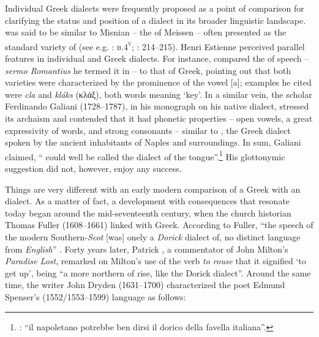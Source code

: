 Individual Greek dialects were frequently proposed as a point of comparison for clarifying the status and position of a  dialect in its broader linguistic landscape.  was said to be similar to Misnian – the  of Meissen – often presented as the standard variety of  (see e.g. \citealt{Borner1705}: \textsc{b.4}\textsc{\textsuperscript{v}}; \citealt{Simonis1752}: 214–215). Henri Estienne perceived parallel features in individual  and Greek dialects. For instance, \citet[3--4]{Estienne1582} compared the  of  speech – \textit{sermo Romantius} he termed it in  – to that of  Greek, pointing out that both varieties were characterized by the prominence of the vowel [a]; examples he cited were  \textit{cla} and  \textit{kláks} (κλάξ), both words meaning ‘key’. In a similar vein, the  scholar Ferdinando Galiani (1728–1787), in his monograph on his native  dialect, stressed its archaism and contended that it had phonetic properties – open vowels, a great expressivity of words, and strong consonants – similar to , the Greek dialect spoken by the ancient inhabitants of Naples and surroundings. In sum, Galiani claimed, “ could well be called the  dialect of the  tongue”.\footnote{\citet[16]{Galiani1779}: “il napoletano potrebbe ben dirsi il dorico della favella italiana”.} His glottonymic suggestion did not, however, enjoy any success.

Things are very different with an early modern comparison of a Greek with an  dialect. As a matter of fact, a development with consequences that resonate today began around the mid-seventeenth century, when the church historian Thomas Fuller (1608–1661) linked  with  Greek. According to Fuller, “the speech of the modern Southern-\textit{Scot} [was] onely a \textit{Dorick} dialect of, no distinct language from \textit{English}” \citep[81]{Fuller1655}. Forty years later, Patrick \citet[20]{Hume1695}, a commentator of John Milton’s \textit{Paradise Lost}, remarked on Milton’s use of the verb \textit{to rouse} that it signified ‘to get up’, being “a more northern  of rise, like the Dorick dialect”. Around the same time, the writer John Dryden (1631–1700) characterized the  poet Edmund Spenser’s (1552/1553–1599) language as follows:

